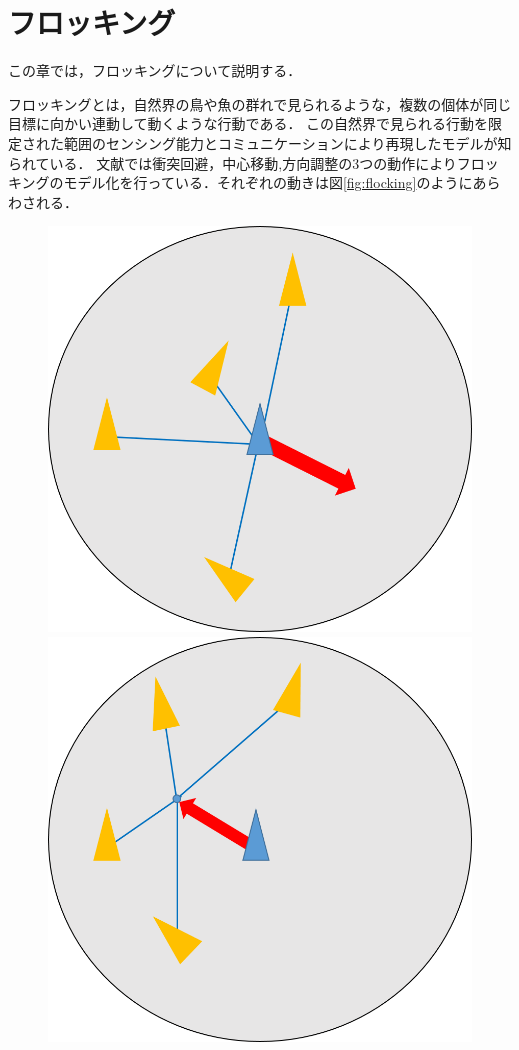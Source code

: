 \documentclass[a4paper,11pt]{jarticle}
\begin{document}
	\section{フロッキング}
	\label{sec:flocking}
	この章では，フロッキングについて説明する．
	
	フロッキングとは，自然界の鳥や魚の群れで見られるような，複数の個体が同じ目標に向かい連動して動くような行動である．
	この自然界で見られる行動を限定された範囲のセンシング能力とコミュニケーションにより再現したモデルが知られている．
	文献\cite{steering}では衝突回避，中心移動,方向調整の3つの動作によりフロッキングのモデル化を行っている．それぞれの動きは図\ref{fig:flocking}のようにあらわされる．
	
	\begin{figure}
		\begin{minipage}{0.3\linewidth}
			\centering
			\includegraphics[width=0.9\linewidth]{png/separation.png}
		\end{minipage}
		\begin{minipage}{0.3\linewidth}
			\centering
			\includegraphics[width=0.9\linewidth]{png/cohesion.png}

\end{minipage}
\end{figure}
\end{document}

